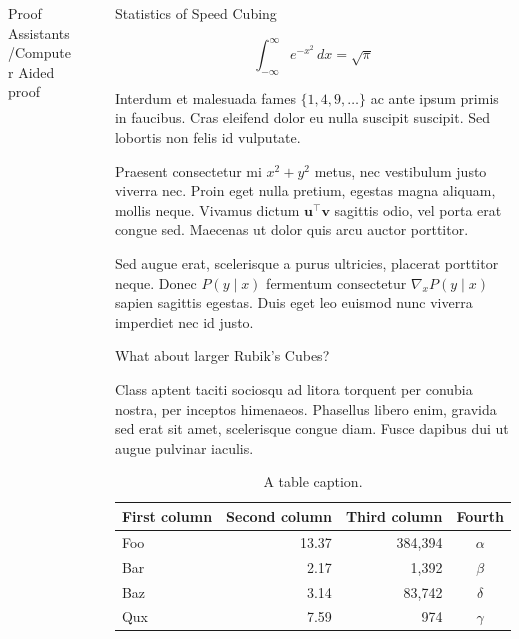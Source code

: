 \documentclass[final]{beamer}
\newlength{\sepwidth}
\newlength{\colwidth}
\newcommand{\separatorcolumn}{\begin{column}{\sepwidth}\end{column}}
\begin{document}
\begin{frame}[t]
\begin{columns}[t]
\begin{column}{\colwidth}
\begin{block}{Proof Assistants/Computer Aided proof}
  \end{block}

\end{column}

\separatorcolumn

\begin{column}{\colwidth}

  \begin{exampleblock}{Statistics of Speed Cubing}

    \large

    $$
    \int_{-\infty}^{\infty} e^{-x^2}\,dx = \sqrt{\pi}
    $$

    Interdum et malesuada fames $\{1, 4, 9, \ldots\}$ ac ante ipsum primis in
    faucibus. Cras eleifend dolor eu nulla suscipit suscipit. Sed lobortis non
    felis id vulputate.


    Praesent consectetur mi $x^2 + y^2$ metus, nec vestibulum justo viverra
    nec. Proin eget nulla pretium, egestas magna aliquam, mollis neque. Vivamus
    dictum $\mathbf{u}^\intercal\mathbf{v}$ sagittis odio, vel porta erat
    congue sed. Maecenas ut dolor quis arcu auctor porttitor.


    Sed augue erat, scelerisque a purus ultricies, placerat porttitor neque.
    Donec $P(y \mid x)$ fermentum consectetur $\nabla_x P(y \mid x)$ sapien
    sagittis egestas. Duis eget leo euismod nunc viverra imperdiet nec id
    justo.

  \end{exampleblock}

  \begin{block}{What about larger Rubik's Cubes?}

    \large Class aptent taciti sociosqu ad litora torquent per conubia nostra, per
    inceptos himenaeos. Phasellus libero enim, gravida sed erat sit amet,
    scelerisque congue diam. Fusce dapibus dui ut augue pulvinar iaculis.

    \begin{table}
      \centering
      \begin{tabular}{l r r c}
        \toprule
        \textbf{First column} & \textbf{Second column} & \textbf{Third column} & \textbf{Fourth} \\
        \midrule
        Foo & 13.37 & 384,394 & $\alpha$ \\
        Bar & 2.17 & 1,392 & $\beta$ \\
        Baz & 3.14 & 83,742 & $\delta$ \\
        Qux & 7.59 & 974 & $\gamma$ \\
        \bottomrule
      \end{tabular}
      \caption{A table caption.}
    \end{table}


\end{block}
\end{column}
\end{columns}
\end{frame}
\end{document}
